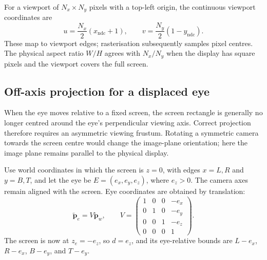 \documentclass[11pt,a4paper]{article}
\newcommand{\vect}[1]{\boldsymbol{#1}}
\newcommand{\ndc}{\mathrm{ndc}}
\numberwithin{equation}{section}
\begin{document}
For a viewport of $N_x\times N_y$ pixels with a top-left origin, the continuous viewport coordinates are
\begin{equation}
u=\frac{N_x}{2}(x_{\ndc}+1),\qquad
v=\frac{N_y}{2}(1-y_{\ndc}).
\end{equation}
These map to viewport edges; rasterisation subsequently samples pixel centres. The physical aspect ratio $W/H$ agrees with $N_x/N_y$ when the display has square pixels and the viewport covers the full screen.

\newpage
\subsection{Off-axis projection for a displaced eye}
When the eye moves relative to a fixed screen, the screen rectangle is generally no longer centred around the eye's perpendicular viewing axis. Correct projection therefore requires an asymmetric viewing frustum. Rotating a symmetric camera towards the screen centre would change the image-plane orientation; here the image plane remains parallel to the physical display.

Use world coordinates in which the screen is $z=0$, with edges $x=L,R$ and $y=B,T$, and let the eye be $E=(e_x,e_y,e_z)$, where $e_z>0$. The camera axes remain aligned with the screen. Eye coordinates are obtained by translation:
\begin{equation}
\widetilde{\vect p}_e=V\widetilde{\vect p}_w,\qquad
V=\begin{pmatrix}1&0&0&-e_x\\0&1&0&-e_y\\0&0&1&-e_z\\0&0&0&1\end{pmatrix}.
\end{equation}
The screen is now at $z_e=-e_z$, so $d=e_z$, and its eye-relative bounds are $L-e_x$, $R-e_x$, $B-e_y$, and $T-e_y$.
\end{document}

